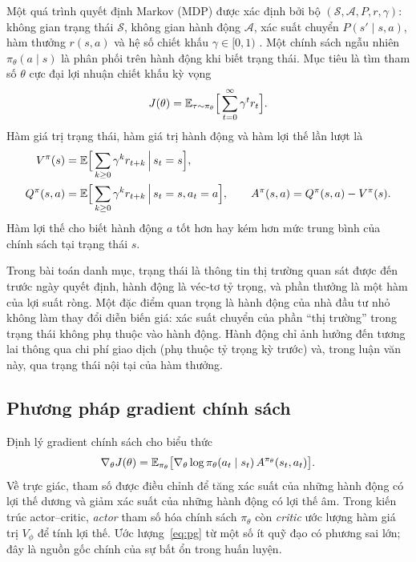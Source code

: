 Một quá trình quyết định Markov (MDP) được xác định bởi bộ $(\mathcal{S},\mathcal{A},P,r,\gamma)$: không gian trạng thái $\mathcal{S}$, không gian hành động $\mathcal{A}$, xác suất chuyển $P(s'\mid s,a)$, hàm thưởng $r(s,a)$ và hệ số chiết khấu $\gamma\in[0,1)$ \cite{sutton2018}. Một chính sách ngẫu nhiên $\pi_\theta(a\mid s)$ là phân phối trên hành động khi biết trạng thái. Mục tiêu là tìm tham số $\theta$ cực đại lợi nhuận chiết khấu kỳ vọng
\begin{equation}
J(\theta)=\mathbb{E}_{\tau\sim\pi_\theta}\Big[\sum_{t=0}^{\infty}\gamma^{t}r_t\Big].
\end{equation}
Hàm giá trị trạng thái, hàm giá trị hành động và hàm lợi thế lần lượt là
\begin{equation}
\begin{aligned}
V^{\pi}(s)&=\mathbb{E}\Big[\sum_{k\ge0}\gamma^{k}r_{t+k}\,\Big|\,s_t=s\Big],\\
Q^{\pi}(s,a)&=\mathbb{E}\Big[\sum_{k\ge0}\gamma^{k}r_{t+k}\,\Big|\,s_t=s,a_t=a\Big],\qquad A^{\pi}(s,a)=Q^{\pi}(s,a)-V^{\pi}(s).
\end{aligned}
\end{equation}
Hàm lợi thế cho biết hành động $a$ tốt hơn hay kém hơn mức trung bình của chính sách tại trạng thái $s$.

Trong bài toán danh mục, trạng thái là thông tin thị trường quan sát được đến trước ngày quyết định, hành động là véc-tơ tỷ trọng, và phần thưởng là một hàm của lợi suất ròng. Một đặc điểm quan trọng là hành động của nhà đầu tư nhỏ không làm thay đổi diễn biến giá: xác suất chuyển của phần ``thị trường'' trong trạng thái không phụ thuộc vào hành động. Hành động chỉ ảnh hưởng đến tương lai thông qua chi phí giao dịch (phụ thuộc tỷ trọng kỳ trước) và, trong luận văn này, qua trạng thái nội tại của hàm thưởng.

\subsection{Phương pháp gradient chính sách}

Định lý gradient chính sách \cite{williams1992,sutton2018} cho biểu thức
\begin{equation}
\nabla_\theta J(\theta)=\mathbb{E}_{\pi_\theta}\big[\nabla_\theta\log\pi_\theta(a_t\mid s_t)\,A^{\pi_\theta}(s_t,a_t)\big].
\label{eq:pg}
\end{equation}
Về trực giác, tham số được điều chỉnh để tăng xác suất của những hành động có lợi thế dương và giảm xác suất của những hành động có lợi thế âm. Trong kiến trúc actor--critic, \emph{actor} tham số hóa chính sách $\pi_\theta$ còn \emph{critic} ước lượng hàm giá trị $V_\phi$ để tính lợi thế. Ước lượng~\eqref{eq:pg} từ một số ít quỹ đạo có phương sai lớn; đây là nguồn gốc chính của sự bất ổn trong huấn luyện.

